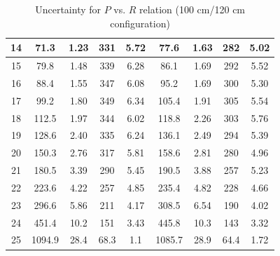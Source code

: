 \documentclass[12pt]{article}
\begin{document}
\begin{table}[H]
\begin{tabular}{|c|c|c|c|c|c|c|c|c|}
14 & 71.3        & 1.23   &331 &5.72     & 77.6        & 1.63     &282  &5.02    \\ \hline
15 & 79.8        & 1.48   &339 &6.28     & 86.1        & 1.69     &292  &5.52    \\ \hline
16 & 88.4        & 1.55   &347 &6.08     & 95.2        & 1.69     &300  &5.30    \\ \hline
17 & 99.2  		 & 1.80   &349 &6.34     & 105.4       & 1.91     &305  &5.54    \\ \hline
18 & 112.5       & 1.97   &344 &6.02     & 118.8       & 2.26     &303  &5.76    \\ \hline
19 & 128.6       & 2.40   &335 &6.24     & 136.1       & 2.49     &294  &5.39    \\ \hline
20 & 150.3       & 2.76   &317 &5.81     & 158.6       & 2.81     &280  &4.96    \\ \hline
21 & 180.5       & 3.39   &290 &5.45     & 190.5       & 3.88     &257  &5.23    \\ \hline
22 & 223.6       & 4.22   &257 &4.85     & 235.4       & 4.82     &228  &4.66    \\ \hline
23 & 296.6       & 5.86   &211 &4.17     & 308.5       & 6.54     &190  &4.02    \\ \hline
24 & 451.4       & 10.2   &151 &3.43     & 445.8       & 10.3     &143  &3.32    \\ \hline
25 & 1094.9      & 28.4   &68.3&1.1      & 1085.7      & 28.9     &64.4 &1.72    \\ \hline
\end{tabular}
\caption{Uncertainty for $P$ vs. $R$ relation (100 cm/120 cm configuration)}
\end{table}
\end{document}
